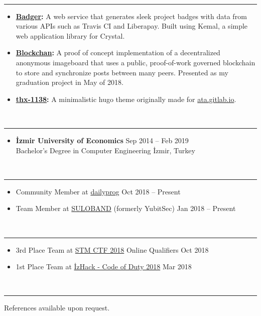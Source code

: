 \documentclass[a4paper, 12pt]{article}
\newcommand{\resumeSection}[1]{\vspace{12pt}{\Large \bfseries #1} \vspace{-9pt} \\ \rule{\textwidth}{0.7pt}}
\newcommand{\resumeSubsection}[1]{\textbf{#1}}
\begin{document}
	\resumeSection{Projects}
	
	\begin{itemize}
		\item \resumeSubsection{\href{https://github.com/LVMBDV/badger}{Badger}:} A web service that generates sleek project badges with data from various APIs such as Travis CI and Liberapay. Built using Kemal, a simple web application library for Crystal.
		\item \resumeSubsection{\href{https://github.com/LVMBDV/blockchan}{Blockchan}:} A proof of concept implementation of a decentralized anonymous imageboard that uses a public, proof-of-work governed blockchain to store and synchronize posts between many peers. Presented as my graduation project in May of 2018.
		\item \resumeSubsection{\href{https://gitlab.com/Ata/thx-1138}{thx-1138}:} A minimalistic hugo theme originally made for \href{https://ata.gitlab.io}{ata.gitlab.io}.
	\end{itemize}
	
	\resumeSection{Education}
	
	\begin{itemize}
		\item \resumeSubsection{İzmir University of Economics} \hfill Sep 2014 – Feb 2019 \\
		Bachelor’s Degree in Computer Engineering \hfill İzmir, Turkey
	\end{itemize}

	\newpage
	
	\resumeSection{Organizations}
	
	\begin{itemize}
		\item Community Member at \href{https://dailyprog.gitlab.io}{dailyprog} \hfill Oct 2018 – Present
		\item Team Member at \href{https://twitter.com/Suloband}{SULOBAND} (formerly YubitSec) \hfill Jan 2018 – Present
	\end{itemize}

	\resumeSection{Accomplishments}

	\begin{itemize}
		\item 3rd Place Team at \href{https://ctf.stm.com.tr}{STM CTF 2018} Online Qualifiers \hfill Oct 2018
		\item 1st Place Team at \href{http://codeofduty.iyte.edu.tr}{İzHack - Code of Duty 2018} \hfill Mar 2018
	\end{itemize}

	\resumeSection{References}
	
	References available upon request.
\end{document}
